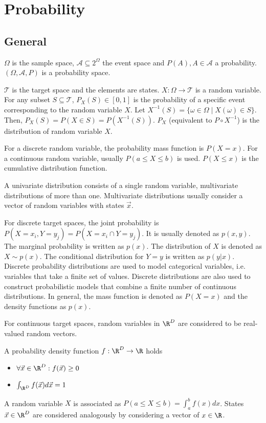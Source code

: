 \section{Probability}

\subsection{General}
$\Omega$ is the sample space,
$\mathcal{A} \subseteq 2^{\Omega}$ the event space and
$P(A), A \in \mathcal{A}$ a probability.
$(\Omega, \mathcal{A}, P)$ is a probability space.

$\mathcal{T}$ is the target space and the elements are states.
$X : \Omega \to \mathcal{T}$ is a random variable.
For any subset $S \subseteq \mathcal{T}$,
$P_X(S) \in [0, 1]$ is the probability of a specific event corresponding
to the random variable $X$.
Let $X^{-1}(S) = \{ \omega \in \Omega \mid X(\omega) \in S \}$.
Then, $P_X(S) = P(X \in S) = P(X^{-1}(S))$.
$P_X$ (equivalent to $P \circ X^{-1}$) is the distribution of
random variable $X$.

For a discrete random variable, the probability mass function is
$P(X = x)$.
For a continuous random variable, usually $P(a \leq X \leq b)$ is used.
$P(X \leq x)$ is the cumulative distribution function.

A univariate distribution consists of a single random variable,
multivariate distributions of more than one.
Multivariate distributions usually consider a vector of random variables
with states $\vec{x}$.

For discrete target spaces, the joint probability is
$P(X = x_i, Y = y_j) = P(X = x_i \cap Y = y_j)$.
It is usually denoted as $p(x, y)$.
The marginal probability is written as $p(x)$.
The distribution of $X$ is denoted as $X \sim p(x)$.
The conditional distribution for $Y = y$ is written as $p(y | x)$.
Discrete probability distributions are used to model
categorical variables, i.e. variables that take a finite set of values.
Discrete distributions are also used to construct probabilistic models
that combine a finite number of continuous distributions.
In general, the mass function is denoted as $P(X = x)$ and the density
functions as $p(x)$.

For continuous target spaces,
random variables in $\R^D$ are considered to be
real-valued random vectors.

A probability density function $f : \R^D \to \R$ holds
\begin{itemize}
    \item $\forall \vec{x} \in \R^D : f(\vec{x}) \geq 0$
    \item $\int_{\R^D}{f(\vec{x}) d\vec{x}} = 1$
\end{itemize}
A random variable $X$ is associated as
$P(a \leq X \leq b) = \int_a^b{f(x) dx}$.
States $\vec{x} \in \R^D$ are considered analogously by
considering a vector of $x \in \R$.


